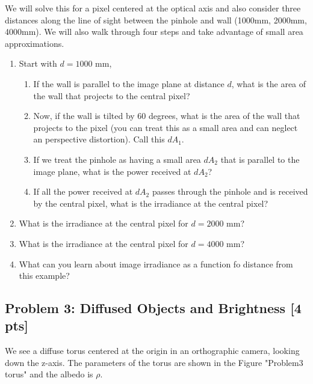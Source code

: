 \documentclass[11pt]{article}
\providecommand{\tightlist}{%
      \setlength{\itemsep}{0pt}\setlength{\parskip}{0pt}}
\begin{document}
We will solve this for a pixel centered at the optical axis and also
consider three distances along the line of sight between the pinhole and
wall (1000mm, 2000mm, 4000mm). We will also walk through four steps and
take advantage of small area approximations.

\begin{enumerate}
\def\labelenumi{\arabic{enumi}.}
\tightlist
\item
  Start with \(d=1000\text{ mm}\),

  \begin{enumerate}
  \def\labelenumii{\arabic{enumii}.}
  \tightlist
  \item
    If the wall is parallel to the image plane at distance \(d\), what
    is the area of the wall that projects to the central pixel?
  \item
    Now, if the wall is tilted by 60 degrees, what is the area of the
    wall that projects to the pixel (you can treat this as a small area
    and can neglect an perspective distortion). Call this \(dA_{1}\).
  \item
    If we treat the pinhole as having a small area \(dA_{2}\) that is
    parallel to the image plane, what is the power received at
    \(dA_{2}\)?
  \item
    If all the power received at \(dA_{2}\) passes through the pinhole
    and is received by the central pixel, what is the irradiance at the
    central pixel?
  \end{enumerate}
\item
  What is the irradiance at the central pixel for \(d=2000\text{ mm}\)?
\item
  What is the irradiance at the central pixel for \(d=4000\text{ mm}\)?
\item
  What can you learn about image irradiance as a function fo distance
  from this example?
\end{enumerate}

    \subsection{Problem 3: Diffused Objects and Brightness {[}4
pts{]}}\label{problem-3-diffused-objects-and-brightness-4-pts}

We see a diffuse torus centered at the origin in an orthographic camera,
looking down the z-axis. The parameters of the torus are shown in the
Figure "Problem3 torus" and the albedo is \(\rho\).
\end{document}
